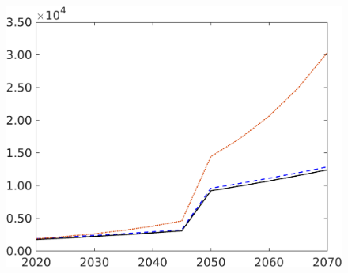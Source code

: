 \begin{figure}[h!!]
\begin{minipage}[]{0.32\textwidth}
\end{minipage}
	\begin{minipage}[]{0.32\textwidth}
		\includegraphics[width=1\textwidth]{../../codding_model/own_basedOnFried/optimalPol_190722_tidiedUp/figures/all_10Aout22/GFF_PercentageLfDynNT_Target_regime3_spillover0_noskill0_sep1_xgrowth0_etaa0.79_lgd0.png}

\end{minipage}
\end{figure}
